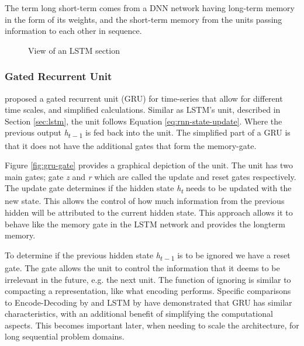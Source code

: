 \documentclass[11pt]{article}
\begin{document}
The term long short-term comes from a DNN network having long-term memory in the form of its weights, and the short-term memory from the units passing information to each other in sequence.

\begin{figure}[!ht]
	\centering
	\caption{View of an LSTM section \cite{Olah2015UnderstandingBlog}}
	\label{fig:lstm-chain}
\end{figure}

\subsubsection{Gated Recurrent Unit} \label{sec:gru}

\citet{ChoLearningTranslation} proposed a gated recurrent unit (GRU) for time-series that allow for different time scales, and simplified calculations. Similar as LSTM's unit, described in Section \ref{sec:lstm}, the unit follows Equation \ref{eq:rnn-state-update}. Where the previous output \textit{h\textsubscript{\(t-1\)}} is fed back into the unit. The simplified part of a GRU is that it does not have the additional gates that form the memory-gate.

Figure \ref{fig:gru-gate} provides a graphical depiction of the unit. The unit has two main gates; gate \textit{z} and \textit{r} which are called the update and reset gates respectively. The update gate determines if the hidden state \textit{h\textsubscript{t}} needs to be updated with the new state. This allows the control of how much information from the previous hidden will be attributed to the current hidden state. This approach allows it to behave like the memory gate in the LSTM network and provides the longterm memory.

To determine if the previous hidden state \textit{h\textsubscript{\(t-1\)}} is to be ignored we have a reset gate. The gate allows the unit to control the information that it deems to be irrelevant in the future, e.g. the next unit. The function of ignoring is similar to compacting a representation, like what encoding performs. Specific comparisons to Encode-Decoding by \citet{ChoOnApproaches} and LSTM by \citet{ChungEmpiricalModeling} have demonstrated that GRU has similar characteristics, with an additional benefit of simplifying the computational aspects. This becomes important later, when needing to scale the architecture, for long sequential problem domains.
\end{document}
